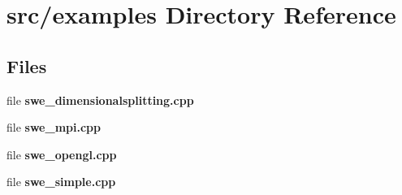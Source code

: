 \section{src/examples Directory Reference}
\label{dir_e931c1a3f0014e624d0645a271726ad2}
\subsection*{Files}
\begin{DoxyCompactItemize}
\item 
file {\bfseries swe\-\_\-dimensionalsplitting.\-cpp}
\item 
file {\bf swe\-\_\-mpi.\-cpp}
\item 
file {\bfseries swe\-\_\-opengl.\-cpp}
\item 
file {\bf swe\-\_\-simple.\-cpp}
\end{DoxyCompactItemize}
